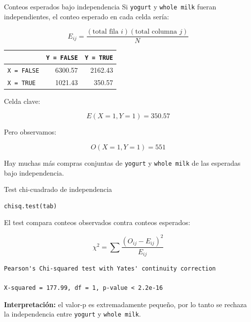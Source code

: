 \documentclass[10pt,aspectratio=169]{beamer}
\begin{document}
\begin{frame}{Conteos esperados bajo independencia}
Si \texttt{yogurt} y \texttt{whole milk} fueran independientes, el conteo esperado en cada celda sería:

\[
E_{ij} = \frac{(\text{total fila } i)(\text{total columna } j)}{N}
\]

\vspace{0.2cm}
\begin{center}
\begin{tabular}{lrr}
\toprule
 & \texttt{Y = FALSE} & \texttt{Y = TRUE} \\
\midrule
\texttt{X = FALSE} & 6300.57 & 2162.43 \\
\texttt{X = TRUE}  & 1021.43 & 350.57 \\
\bottomrule
\end{tabular}
\end{center}

\vspace{0.3cm}
Celda clave:

\[
E(X=1,Y=1)=350.57
\]

Pero observamos:

\[
O(X=1,Y=1)=551
\]

Hay muchas más compras conjuntas de \texttt{yogurt} y \texttt{whole milk} de las esperadas bajo independencia.
\end{frame}

\begin{frame}[fragile]{Test chi-cuadrado de independencia}
\begin{lstlisting}[style=Rstyle]
chisq.test(tab)
\end{lstlisting}

\vspace{0.3cm}
El test compara conteos observados contra conteos esperados:

\[
\chi^2 = \sum \frac{(O_{ij} - E_{ij})^2}{E_{ij}}
\]


\begin{lstlisting}[style=Rstyle]
Pearson's Chi-squared test with Yates' continuity correction

X-squared = 177.99, df = 1, p-value < 2.2e-16
\end{lstlisting}

\vspace{0.2cm}
\textbf{Interpretación:} el valor-p es extremadamente pequeño, por lo tanto se rechaza la independencia entre \texttt{yogurt} y \texttt{whole milk}.


\end{frame}
\end{document}
